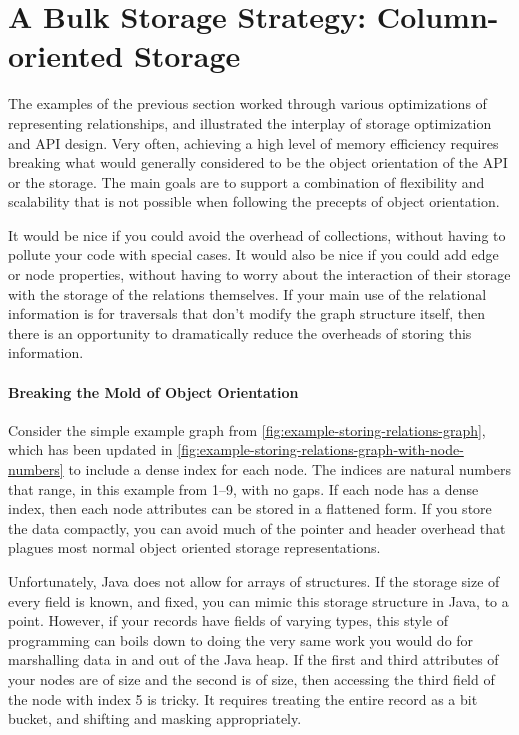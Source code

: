 \section{A Bulk Storage Strategy: Column-oriented Storage}
\label{sec:column-oriented}

The examples of the previous section worked through various optimizations of
representing relationships, and illustrated the interplay of storage optimization
and API design. Very often, achieving a high level of memory efficiency requires
breaking what would generally considered to be the object orientation of the API
or the storage. The main goals are to support a combination of flexibility and
scalability that is not possible when following the precepts of object
orientation.

It would be nice if you could avoid the overhead of collections, without having
to pollute your code with special cases. It would also be nice if you could add
edge or node properties, without having to worry about the interaction of their
storage with the storage of the relations themselves. If your main use of the
relational information is for traversals that don't modify the graph structure
itself, then there is an opportunity to dramatically reduce the overheads of
storing this information.

\paragraph{Breaking the Mold of Object Orientation}

Consider the simple example graph from
\autoref{fig:example-storing-relations-graph}, which has been updated in
\autoref{fig:example-storing-relations-graph-with-node-numbers} to include a
dense index for each node. The indices are natural numbers that range, in this
example from 1--9, with no gaps. If each node has a dense index, then each node
attributes can be stored in a flattened form. If you store the data compactly,
you can avoid much of the pointer and header overhead that plagues most normal
object oriented storage representations.


 

Unfortunately, Java does not allow for arrays of structures. If the storage size
of every field is known, and fixed, you can mimic this storage structure in Java,
to a point. However, if your records have fields of varying types, this style of
programming can boils down to doing the very same work you would do for
marshalling data in and out of the Java heap. If the first and third attributes
of your nodes are of  size and the second is of  size,
then accessing the third field of the node with index 5 is tricky. It requires
treating the entire record as a bit bucket, and shifting and masking
appropriately.

